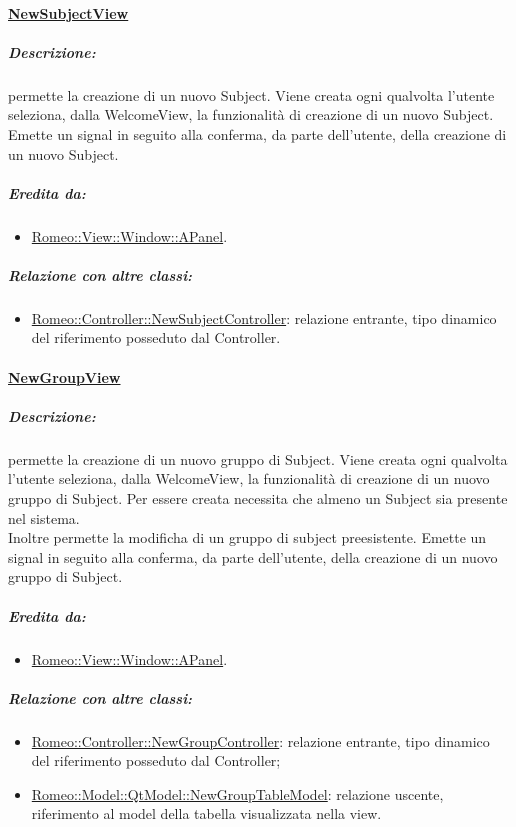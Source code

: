 		\paragraph{\underline{NewSubjectView}}
		\label{nsv}
			\subparagraph{Descrizione:} permette la creazione di un nuovo Subject\glossario{}. Viene creata ogni qualvolta l'utente seleziona, dalla WelcomeView, la funzionalità di creazione di un nuovo Subject\glossario{}. Emette un signal\g{} in seguito alla conferma, da parte dell'utente, della creazione di un nuovo Subject\glossario{}.
			\subparagraph{Eredita da:}
				\begin{itemize}	
					 \item \hyperref[ab_panel]{Romeo::View::Window::APanel}.
				\end{itemize}
			\subparagraph{Relazione con altre classi:}
				\begin{itemize}
					\item \hyperref[controller_ns]{Romeo::Controller::NewSubjectController}: relazione entrante, tipo dinamico del riferimento posseduto dal Controller.
				\end{itemize}
	
		\paragraph{\underline{NewGroupView}}
		\label{ngv} 
			\subparagraph{Descrizione:} permette la creazione di un nuovo gruppo di Subject\glossario{}. Viene creata ogni qualvolta l'utente seleziona, dalla WelcomeView, la funzionalità di creazione di un nuovo gruppo di Subject\glossario{}. Per essere creata necessita che almeno un Subject\g{} sia presente nel sistema.
			\\Inoltre permette la modificha di un gruppo di subject\g{} preesistente.
			 Emette un signal\g{} in seguito alla conferma, da parte dell'utente, della creazione di un nuovo gruppo di Subject\glossario{}.
			\subparagraph{Eredita da:}
				\begin{itemize}
					\item \hyperref[ab_panel]{Romeo::View::Window::APanel}.
				\end{itemize}
			\subparagraph{Relazione con altre classi:}
				\begin{itemize}
					\item \hyperref[controller_ngs]{Romeo::Controller::NewGroupController}: relazione entrante, tipo dinamico del riferimento posseduto dal Controller;
					\item \hyperref[controller_tm]{Romeo::Model::QtModel::NewGroupTableModel}: relazione uscente, riferimento al model della tabella visualizzata nella view.
				\end{itemize}
		
